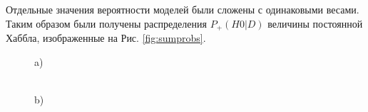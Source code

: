 Отдельные значения вероятности моделей были сложены с одинаковыми весами. Таким образом были получены распределения $P_+( H0 |D)$ величины постоянной Хаббла, изображенные на Рис. \ref{fig:sumprobs}.

\begin{figure}[H]
\begin{minipage}[h]{0.47\linewidth}
 a) \\
\end{minipage}
\hfill
\begin{minipage}[h]{0.47\linewidth}
 \\b)

\end{minipage}
\end{figure}
